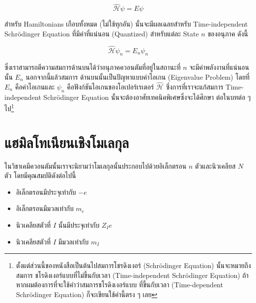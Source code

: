\begin{equation}
    \label{eq:time_independent_schrodinger}
    \hat{\mathscr{H}} \psi = E \psi
\end{equation}

สำหรับ Hamiltonians เกือบทั้งหมด (ไม่ใช้ทุกอัน) นั้นจะมีผลเฉลยสำหรับ Time-independent Schr\"{o}dinger Equation ที่มีค่าที่แน่นอน
(Quantized) สำหรับแต่ละ State $n$ ของอนุภาค ดังนี้

\begin{equation}
    \hat{\mathscr{H}} \psi_n = E_n \psi_n
\end{equation}

\noindent ซึ่งเราสามารถตีความสมการด้านบนได้ว่าอนุภาคควอนตัมที่อยู่ในสถานะที่ $n$ จะมีค่าพลังงานที่แน่นอนนั้น $E_n$ นอกจากนี้แล้วสมการ%
ด้านบนนั้นเป็นปัญหาแบบค่าไอเกน (Eigenvalue Problem) โดยที่ $E_n$ คือค่าไอเกนและ $\psi_n$ คือฟังก์ชันไอเกนของโอเปอร์เรเตอร์
$\hat{\mathscr{H}}$ ซึ่งการที่เราจะแก้สมการ Time-independent Schr\"{o}dinger Equation นั้นจะต้องอาศัยเทคนิคพิเศษซึ่งจะได้ศึกษา%
ต่อในบทต่อ ๆ ไป\footnote{ตั้งแต่ส่วนนี้ของหนังสือเป็นต้นไปสมการโชรดิงเงอร์ (Schr\"{o}dinger Equation) นั้นจะหมายถึงสมการ%
ชโรดิงเงอร์แบบที่ไม่ขึ้นกับเวลา (Time-independent Schr\"{o}dinger Equation) ถ้าหากผมต้องการที่จะใช้คำว่าสมการชโรดิงเงอร์แบบ%
ที่ขึ้นกับเวลา (Time-dependent Schr\"{o}dinger Equation) ก็จะเขียนใช้คำนี้ตรง ๆ เลย}

\section{แฮมิลโทเนียนเชิงโมเลกุล}

ในวิชาเคมีควอนตัมนั้นเราจะนิยามว่าโมเลกุลนั้นประกอบไปด้วยอิเล็กตรอน $n$ ตัวและนิวเคลียส $N$ ตัว โดยมีคุณสมบัติดังต่อไปนี้

\begin{itemize}[topsep=0pt,noitemsep]
    \setlength\itemsep{1em}
    \item อิเล็กตรอนมีประจุเท่ากับ $-e$

    \item อิเล็กตรอนมีมวลเท่ากับ $m_e$

    \item นิวเคลียสตัวที่ $I$ นั้นมีประจุเท่ากับ $Z_I e$

    \item นิวเคลียสตัวที่ $I$ มีมวลเท่ากับ $m_I$
\end{itemize}

